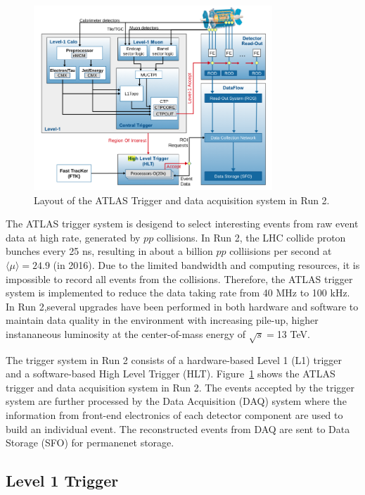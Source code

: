 \begin{figure}[!htb]
    \includegraphics[width=0.8\textwidth]{figs/tdaq.png}
    \centering
    \caption{Layout of the ATLAS Trigger and data acquisition system in Run 2.}
    \label{fig:tdaq}
\end{figure}

The ATLAS trigger system is desigend to select interesting events from raw event data at high rate, generated by $pp$ collisions. In Run 2, the LHC collide proton bunches every 25 \si{\nano\second}, resulting in about a billion $pp$ colliisions per second at $\langle\mu\rangle = 24.9$ (in 2016). Due to the limited bandwidth and computing resources, it is impossible to record all events from the collisions. Therefore, the ATLAS trigger system is implemented to reduce the data taking rate from 40 \si{\mega\hertz} to 100 \si{\kilo\hertz}. In Run 2,several upgrades have been performed in both hardware and software to maintain data quality in the environment with increasing pile-up, higher instananeous luminosity at the center-of-mass energy of $\sqrt{s}=$13 TeV.

The trigger system in Run 2 consists of a hardware-based Level 1 (L1) trigger and a software-based High Level Trigger (HLT). Figure~\ref{fig:tdaq} shows the ATLAS trigger and data acquisition system in Run 2. The events accepted by the trigger system are further processed by the Data Acquisition (DAQ) system where the information from front-end electronics of each detector component are used to build an individual event. The reconstructed events from DAQ are sent to Data Storage (SFO) for permanenet storage.



\subsection{Level 1 Trigger}
\label{sec:atlas:l1trigger}

